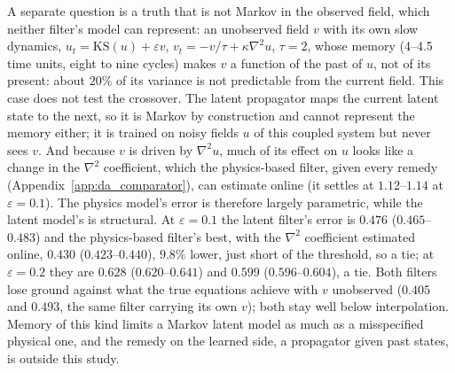  A separate question is a truth that is not Markov in the observed field, which
neither filter's model can represent: an
unobserved field $v$ with its own slow dynamics, $u_t=\mathrm{KS}(u)+\varepsilon v$,
$v_t=-v/\tau+\kappa\nabla^2u$, $\tau=2$, whose memory (4--4.5 time units, eight to nine cycles) makes $v$ a
function of the past of $u$, not of its present: about $20\%$ of its variance is not predictable from
the current field. This case does not test the crossover. The latent propagator maps the current
latent state to the next, so it is Markov by construction and cannot represent the memory either;
it is trained on noisy fields $u$ of this coupled system but never sees $v$. And because $v$ is
driven by $\nabla^2u$, much of its effect on $u$ looks like a change in the $\nabla^2$ coefficient,
which the physics-based filter, given every remedy (Appendix~\ref{app:da_comparator}), can estimate
online (it settles at $1.12$--$1.14$ at $\varepsilon=0.1$). The physics model's
error is therefore largely parametric, while the latent model's is structural. At $\varepsilon=0.1$
the latent filter's error is $0.476$ ($0.465$--$0.483$) and the physics-based filter's best, with
the $\nabla^2$ coefficient estimated online, $0.430$ ($0.423$--$0.440$), $9.8\%$ lower, just short of the threshold, so a tie; at
$\varepsilon=0.2$ they are $0.628$ ($0.620$--$0.641$) and $0.599$ ($0.596$--$0.604$), a tie. Both
filters lose ground against what the true equations achieve with $v$ unobserved ($0.405$ and
$0.493$, the same filter carrying its own $v$); both stay well below interpolation. Memory of this
kind limits a Markov latent model as much as a misspecified physical one, and the remedy on the
learned side, a propagator given past states, is outside this study.

